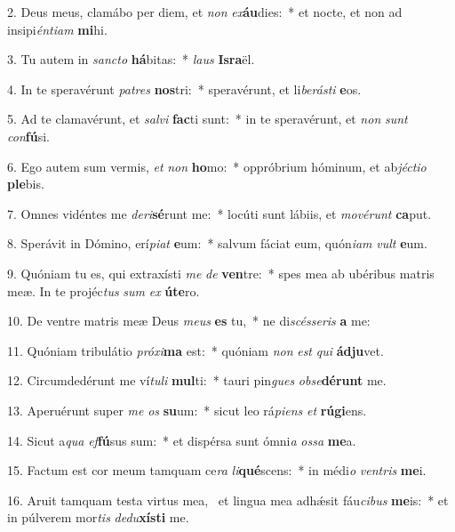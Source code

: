 2. Deus meus, clamábo per diem, et \textit{non} \textit{ex}\textbf{áu}dies:~*  et nocte, et non ad insipi\textit{én}\textit{ti}\textit{am} \textbf{mi}hi.\

3. Tu autem in \textit{sanc}\textit{to} \textbf{há}bitas:~*  \textit{laus} \textbf{Is}\textbf{ra}ël.\

4. In te speravérunt \textit{pa}\textit{tres} \textbf{nos}tri:~*  speravérunt, et li\textit{be}\textit{rás}\textit{ti} \textbf{e}os.\

5. Ad te clamavérunt, et \textit{sal}\textit{vi} \textbf{fac}ti sunt:~*  in te speravérunt, et \textit{non} \textit{sunt} \textit{con}\textbf{fú}si.\

6. Ego autem sum vermis, \textit{et} \textit{non} \textbf{ho}mo:~*  oppróbrium hóminum, et ab\textit{jéc}\textit{ti}\textit{o} \textbf{ple}bis.\

7. Omnes vidéntes me \textit{de}\textit{ri}\textbf{sé}runt me:~*  locúti sunt lábiis, et \textit{mo}\textit{vé}\textit{runt} \textbf{ca}put.\

8. Sperávit in Dómino, erí\textit{pi}\textit{at} \textbf{e}um:~*  salvum fáciat eum, quón\textit{i}\textit{am} \textit{vult} \textbf{e}um.\

9. Quóniam tu es, qui extraxísti \textit{me} \textit{de} \textbf{ven}tre:~*  spes mea ab ubéribus matris meæ. In te projéc\textit{tus} \textit{sum} \textit{ex} \textbf{ú}\textbf{te}ro.\

10. De ventre matris meæ Deus \textit{me}\textit{us} \textbf{es} tu,~*  ne di\textit{scés}\textit{se}\textit{ris} \textbf{a} me:\

11. Quóniam tribulátio \textit{pró}\textit{xi}\textbf{ma} est:~*  quóniam \textit{non} \textit{est} \textit{qui} \textbf{ád}\textbf{ju}vet.\

12. Circumdedérunt me ví\textit{tu}\textit{li} \textbf{mul}ti:~*  tauri pin\textit{gues} \textit{ob}\textit{se}\textbf{dé}\textbf{runt} me.\

13. Aperuérunt super \textit{me} \textit{os} \textbf{su}um:~*  sicut leo rá\textit{pi}\textit{ens} \textit{et} \textbf{rú}\textbf{gi}ens.\

14. Sicut a\textit{qua} \textit{ef}\textbf{fú}sus sum:~*  et dispérsa sunt ómni\textit{a} \textit{os}\textit{sa} \textbf{me}a.\

15. Factum est cor meum tamquam ce\textit{ra} \textit{li}\textbf{qué}scens:~*  in médi\textit{o} \textit{ven}\textit{tris} \textbf{me}i.\

16. Aruit tamquam testa virtus mea, \dag\  et lingua mea adhǽsit fáu\textit{ci}\textit{bus} \textbf{me}is:~*  et in púlverem mor\textit{tis} \textit{de}\textit{du}\textbf{xís}\textbf{ti} me.\


